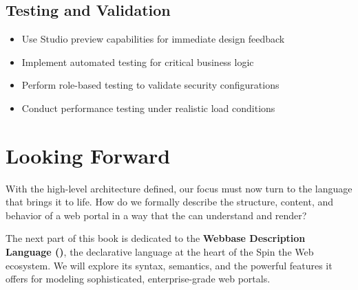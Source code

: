 \subsection{Testing and Validation}

\begin{itemize}
	\item Use Studio preview capabilities for immediate design feedback
	\item Implement automated testing for critical business logic
	\item Perform role-based testing to validate security configurations
	\item Conduct performance testing under realistic load conditions
\end{itemize}

\section{Looking Forward}
\label{sec:architecture-forward}

With the high-level architecture defined, our focus must now turn to the language that brings it to life. How do we formally describe the structure, content, and behavior of a web portal in a way that the \webspinner{} can understand and render?

The next part of this book is dedicated to the \textbf{Webbase Description Language (\wbdl{})}, the declarative language at the heart of the Spin the Web ecosystem. We will explore its syntax, semantics, and the powerful features it offers for modeling sophisticated, enterprise-grade web portals.
